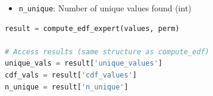 \documentclass[11pt]{article}
\begin{document}
\begin{enumerate}
\begin{enumerate}
\begin{itemize}
\begin{itemize}
	      	      	      	\item \texttt{n\_unique}: Number of unique values found (int)
	      	      	      \end{itemize}
	      	      \end{itemize}
	      	      \begin{lstlisting}[language=Python, caption={Expert EDF Computation with Pre-sorted Permutation}]
result = compute_edf_expert(values, perm)

# Access results (same structure as compute_edf)
unique_vals = result['unique_values']
cdf_vals = result['cdf_values']
n_unique = result['n_unique']
	      	      \end{lstlisting}
	      \end{enumerate}
\end{enumerate}
\end{document}
